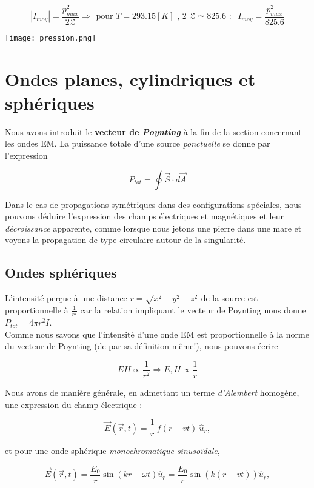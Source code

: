 \[ |I_{moy}| = \frac{p_{max}^{2}}{2 \mathcal{Z}} \Rightarrow \hspace{5pt} \mbox{pour $T = 293.15[K]$ , 2 $\mathcal{Z} \simeq 825.6$  : } \hspace{5pt} I_{moy} = \frac{p_{max}^{2}}{825.6}\]

\begin{center}
	\texttt{[image: pression.png]}
\end{center}

\section{Ondes planes, cylindriques et sphériques}

Nous avons introduit le \textbf{vecteur de \textit{Poynting}} à la fin de la section concernant les ondes EM. La puissance totale d'une source \textit{ponctuelle} se donne par l'expression 

\[P_{tot} = \oint \vec{S} \cdot d\vec{A}\]

Dans le cas de propagations symétriques dans des configurations spéciales, nous pouvons déduire l'expression des champs électriques et magnétiques et leur \textit{décroissance} apparente, comme 
lorsque nous jetons une pierre dans une mare et voyons la propagation de type circulaire autour de la singularité. 

\subsection{Ondes sphériques} 

L'intensité perçue à une distance $r = \sqrt{x^{2} + y^{2} + z^{2}}$ de la source est proportionnelle à $\frac{1}{r^{2}}$ car la relation impliquant le vecteur de Poynting nous 
donne $P_{tot} = 4 \pi r^{2} I$. \\ 
Comme nous savons que l'intensité d'une onde EM est proportionnelle à la norme du vecteur de Poynting (de par sa définition même!), nous pouvons écrire 

\[ EH \propto \frac{1}{r^{2}} \Rightarrow E,H \propto \frac{1}{r}\]

Nous avons de manière générale, en admettant un terme \textit{d'Alembert} homogène, une expression du champ électrique : 

\[\vec{E}(\vec{r},t) = \frac{1}{r} \:f(r-vt) \:\hat{u}_{r},\] 

et pour une onde sphérique \textit{monochromatique sinusoïdale},

\[\vec{E}(\vec{r},t) = \frac{E_{0}}{r} \sin(kr-\omega t) \hat{u}_{r} = \frac{E_{0}}{r} \sin(k(r- vt)) \hat{u}_{r}, \]

